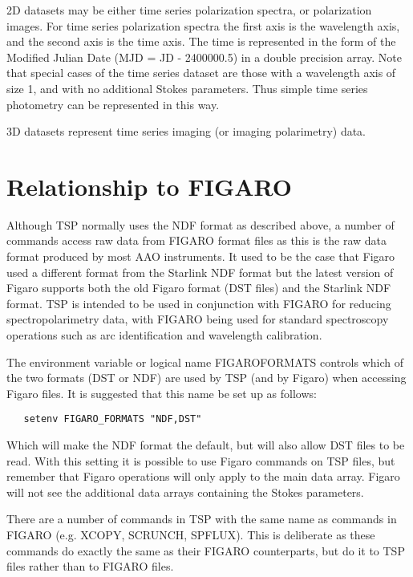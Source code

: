 \documentclass[11pt,twoside]{article}
\renewcommand{\_}{\texttt{\symbol{95}}}
\begin{document}
2D datasets may be either time series polarization spectra, or polarization images. For time series polarization spectra the first axis
is the wavelength axis, and the second axis is the time axis. The time is
represented in the form of the Modified Julian Date (MJD = JD - 2400000.5)
in a double precision array. Note that special cases of the time series
dataset are those with a wavelength axis of size 1, and with no additional
Stokes parameters. Thus simple time series photometry can be represented
in this way.

3D datasets represent time series imaging (or imaging polarimetry) data.

\section{Relationship to FIGARO}

Although TSP normally uses the NDF format as described above, a
number of commands access raw data from FIGARO format files as this is the
raw data format produced by most AAO instruments. It used to be the case that
Figaro used a different format from the Starlink NDF format but the latest
version of Figaro supports both the old Figaro format (DST files) and the
Starlink NDF format. TSP is intended to be used in conjunction with FIGARO for
reducing spectropolarimetry data, with FIGARO being used for standard
spectroscopy operations such as arc identification and wavelength calibration.

The environment variable or logical name FIGARO\_FORMATS controls which of the two formats (DST or NDF)
are used by TSP (and by Figaro)  when accessing Figaro files. It is suggested
that this name be set up as follows:

\begin{verbatim}
   setenv FIGARO_FORMATS "NDF,DST"
\end{verbatim}


Which will make the NDF format the default, but will also allow DST files to
be read. With this setting it is possible to use Figaro commands on TSP files,
but remember that Figaro operations will only apply to the main data array.
Figaro will not see the additional data arrays containing the Stokes
parameters.

There are a number of commands in TSP with the same name as commands in
FIGARO (e.g. XCOPY, SCRUNCH, SPFLUX). This is deliberate as these commands
do exactly the same as their FIGARO counterparts, but do it to TSP files
rather than to FIGARO files.
\end{document}
